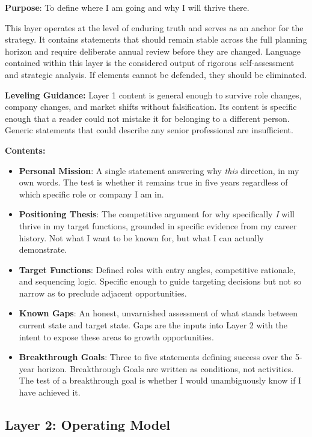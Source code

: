 \documentclass{article}
\begin{document}
\textbf{Purpose}: To define where I am going and why I will thrive there.

This layer operates at the level of enduring truth and serves as an anchor for the strategy. It contains statements that 
should remain stable across the full planning horizon and require deliberate annual review before they are changed.
Language contained within this layer is the considered output of rigorous self-assessment and strategic analysis.
If elements cannot be defended, they should be eliminated.

\textbf{Leveling Guidance:} Layer 1 content is general enough to survive role changes, company changes, and market 
shifts without falsification. Its content is specific enough that a reader could not mistake it for belonging to a
different person. Generic statements that could describe any senior professional are insufficient.

\textbf{Contents:}

\begin{itemize}
\item \textbf{Personal Mission}: A single statement answering why \textit{this} direction, in my own words.
	The test is whether it remains true in five years regardless of which specific role or company I am in.
\item \textbf{Positioning Thesis}: The competitive argument for why specifically \textit{I} will thrive in my target functions, grounded in 
	specific evidence from my career history. Not what I want to be known for, but what I can actually demonstrate.
\item \textbf{Target Functions}: Defined roles with entry angles, competitive rationale, and sequencing logic.
	Specific enough to guide targeting decisions but not so narrow as to preclude adjacent opportunities.
\item \textbf{Known Gaps}: An honest, unvarnished assessment of what stands between current state and target state.
	Gaps are the inputs into Layer 2 with the intent to expose these areas to growth opportunities.
\item \textbf{Breakthrough Goals}: Three to five statements defining success over the 5-year horizon. Breakthrough Goals are written 
	as conditions, not activities. The test of a breakthrough goal is whether I would unambiguously know if I have achieved it.
\end{itemize}

\newpage

\subsection{Layer 2: Operating Model}
\end{document}
